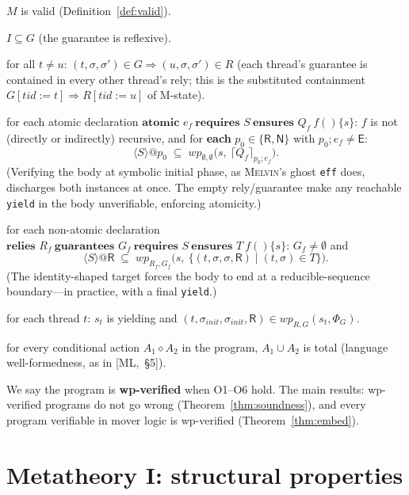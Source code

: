 \documentclass[11pt]{article}
\theoremstyle{plain}
\theoremstyle{plain}
\theoremstyle{definition}
\newcommand{\MR}{\mathsf{R}}
\newcommand{\MN}{\mathsf{N}}
\newcommand{\ME}{\mathsf{E}}
\newcommand{\wpx}{\mathit{wp}}
\newcommand{\one}[1]{\langle #1\rangle}
\newcommand{\upemb}[2]{\lceil #1\rceil_{#2}}     %
\newcommand{\cact}[2]{#1\diamond #2}                 %
\newcommand{\melvin}{\textsc{Melvin}}
\newcommand{\code}[1]{\texttt{#1}}
\begin{document}
\begin{description}[leftmargin=3.2em,style=nextline,itemsep=3pt]
\item[(O1)] $M$ is valid (Definition~\ref{def:valid}).
\item[(O2)] $I \subseteq G$ (the guarantee is reflexive).
\item[(O3)] for all $t\neq u$:
  $(t,\sigma,\sigma')\in G \Rightarrow (u,\sigma,\sigma')\in R$ (each thread's
  guarantee is contained in every other thread's rely; this is the substituted
  containment $G[\mathit{tid}{:=}t]\Rightarrow R[\mathit{tid}{:=}u]$ of M-state).
\item[(O4a)] for each atomic declaration
  $\textbf{atomic } e_f\ \textbf{requires } S\ \textbf{ensures } Q_f\ f()\{s\}$:
  $f$ is not (directly or indirectly) recursive, and for \textbf{each}
  $p_0\in\{\MR,\MN\}$ with $p_0;e_f\neq\ME$:
  \[\one{S}@p_0 \;\subseteq\; \wpx_{\emptyset,\emptyset}\bigl(s,\ \upemb{Q_f}{p_0;e_f}\bigr).\]
  (Verifying the body at symbolic initial phase, as \melvin{}'s ghost \code{eff}
  does, discharges both instances at once. The empty rely/guarantee make any
  reachable \code{yield} in the body unverifiable, enforcing atomicity.)
\item[(O4b)] for each non-atomic declaration
  $\textbf{relies } R_f\ \textbf{guarantees } G_f\ \textbf{requires } S\ \textbf{ensures } T\ f()\{s\}$:
  $G_f\neq\emptyset$ and
  \[\one{S}@\MR \;\subseteq\; \wpx_{R_f,G_f}\bigl(s,\ \{(t,\sigma,\sigma,\MR)\mid (t,\sigma)\in T\}\bigr).\]
  (The identity-shaped target forces the body to end at a reducible-sequence
  boundary---in practice, with a final \code{yield}.)
\item[(O5)] for each thread $t$: $s_t$ is yielding and
  $(t,\sigma_{\mathit{init}},\sigma_{\mathit{init}},\MR) \in \wpx_{R,G}(s_t,\Phi_G)$.
\item[(O6)] for every conditional action $\cact{A_1}{A_2}$ in the program,
  $A_1\cup A_2$ is total (language well-formedness, as in [ML,~\S5]).
\end{description}

We say the program is \textbf{wp-verified} when O1--O6 hold. The main results:
wp-verified programs do not go wrong (Theorem~\ref{thm:soundness}), and every
program verifiable in mover logic is wp-verified (Theorem~\ref{thm:embed}).

\section{Metatheory I: structural properties}\label{sec:meta1}
\end{document}
